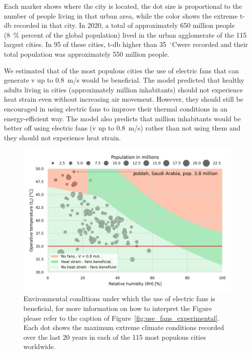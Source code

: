 Each marker shows where the city is located, the dot size is proportional to the number of people living in that urban area, while the color shows the extreme \ac{t-db} recorded in that city.
In 2020, a total of approximately 650 million people (8~\% percent of the global population) lived in the urban agglomerate of the 115 largest cities.
In 95 of these cities, \ac{t-db} higher than 35~$^{\circ}$C\@ were recorded and their total population was approximately 550 million people.

We estimated that  of the most populous cities the use of electric fans that can generate \ac{v} up to 0.8~m/s would be beneficial.
The  model predicted that healthy adults living in  cities (approximately  million inhabitants) should not experience heat strain even without increasing air movement. 
However, they should still be encouraged in using electric fans to improve their thermal conditions in an energy-efficient way.
The model also predicts that  million inhabitants would be better off using electric fans (\ac{v} up to 0.8~m/s) rather than not using them and they should not experience heat strain.

\begin{figure}[thb!]
    \centering
    \includegraphics[width=\textwidth]{figures/use_fans_and_population}
    \caption{Environmental conditions under which the use of electric fans is beneficial, for more information on how to interpret the Figure please refer to the caption of Figure~\ref{fig:use_fans_experimental}.
    Each dot shows the maximum extreme climate conditions recorded over the last 20 years in each of the 115 most populous cities worldwide.}
    \label{fig:use_fans_and_population}
\end{figure}

